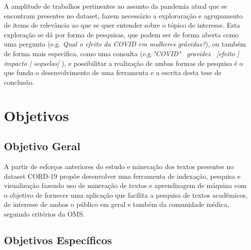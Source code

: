 \documentclass[
	12pt,				%
	a4paper,			%
	english,			%
	brazil,				%
	]{article}
\begin{document}
A amplitude de trabalhos pertinentes ao assunto da pandemia atual
que se encontram presentes no dataset,
fazem necessário a exploraração e agrupamento de items
de relev\^ ancia ao que se quer entender sobre o t\' opico de interesse.
Esta exploração se dá por forma de pesquisas, que podem ser de forma aberta
como uma pergunta (e.g. \emph{Qual o efeito da COVID em mulheres grávidas?}),
ou tamb\' em de forma mais especifica, como uma consulta
(e.g.\emph{"COVID" \ gravidez \ [efeito | impacto | sequelas]} ),
e possibilitar a realização de ambas formas de pesquisa \' e o que funda
o desenvolvimento de uma ferramenta e a escrita desta tese de conclusão.

\section{Objetivos}



\subsection{Objetivo Geral}

    A partir de esfor\c cos anteriores do estudo e minera\c c\~ ao dos textos presentes no dataset CORD-19
    prop\~oe desenvolver uma ferramenta de indexa\c c\~ ao, pesquisa e visualiza\c c\~ ao
    fazendo uso de minera\c c\~ ao de textos e aprendizagem de m\' aquina
    com o objetivo de fornecer uma aplica\c c\~ ao que facilita a pesquisa de textos acad\^ emicos,
    de interesse de ambos o público em geral e tamb\' em da comunidade m\' edica,
    seguindo crit\' erios da OMS.


\subsection{Objetivos Espec\' ificos}
\end{document}

